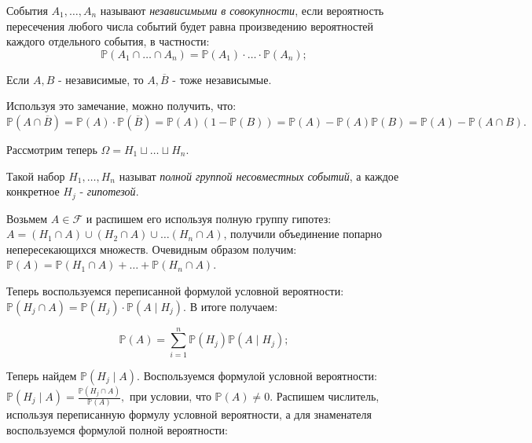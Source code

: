\documentclass[12pt,a4paper]{article}
\begin{document}
\begin{definition}
    События \(A_1, \ldots, A_n \) называют \textit{независимыми в совокупности}, если вероятность пересечения любого числа событий будет равна произведению вероятностей каждого отдельного события, в частности: \[ \mathbb{P} \left(A_1 \cap \dots \cap A_n\right) = \mathbb{P} \left( A_1\right) \cdot \ldots \cdot \mathbb{P} \left( A_n\right);\]
\end{definition}

\begin{remark}
    Если \(A, B\) - независимые, то \(A, \overline{B}\) - тоже независымые.
\end{remark}

Используя это замечание, можно получить, что: \( \mathbb{P}( A \cap \overline{B}) = \mathbb{P} ( A) \cdot \mathbb{P} ( \overline{B})= \mathbb{P}( A) ( 1 - \mathbb{P}( B)) = \mathbb{P}( A) - \mathbb{P}( A) \mathbb{P}( B) = \mathbb{P}(A) - \mathbb{P}( A \cap B).\)

Рассмотрим теперь \(\Omega = H_1 \sqcup \dots \sqcup H_n\). 

\begin{definition}
    Такой набор \(H_1, \ldots, H_n\) называт \textit{полной группой несовместных событий}, а каждое конкретное \(H_j\) - \textit{гипотезой}. 
\end{definition}

Возьмем \(A \in \mathcal{F}\) и распишем его используя полную группу гипотез: \( A = (H_1 \cap A) \cup (H_2 \cap A) \cup \dots (H_n \cap A)\), получили объединение попарно непересекающихся множеств.
Очевидным образом получим: \(\mathbb{P} (A) = \mathbb{P}(H_1 \cap A) + \ldots + \mathbb{P} (H_n \cap A).\)

Теперь воспользуемся переписанной формулой условной вероятности: \(\mathbb{P}(H_j \cap A) = \mathbb{P} (H_j) \cdot \mathbb{P}(A \mid H_j).\)
В итоге получаем:

\begin{definition}
    \[\mathbb{P}(A) = \sum\limits_{ i = 1}^{n} \mathbb{P} (H_j) \mathbb{P} (A \mid H_j);\]
\end{definition}

Теперь найдем \(\mathbb{P}(H_j \mid A)\). Воспользуемся формулой условной вероятности: \( \mathbb{P}(H_j \mid A) = \frac{ \mathbb{P} (H_j \cap A)}{ \mathbb{P}(A)},\) при условии, что \(\mathbb{P}(A) \neq 0\). Распишем числитель, используя переписанную формулу условной вероятности, а для знаменателя воспользуемся формулой полной вероятности: 
\end{document}
